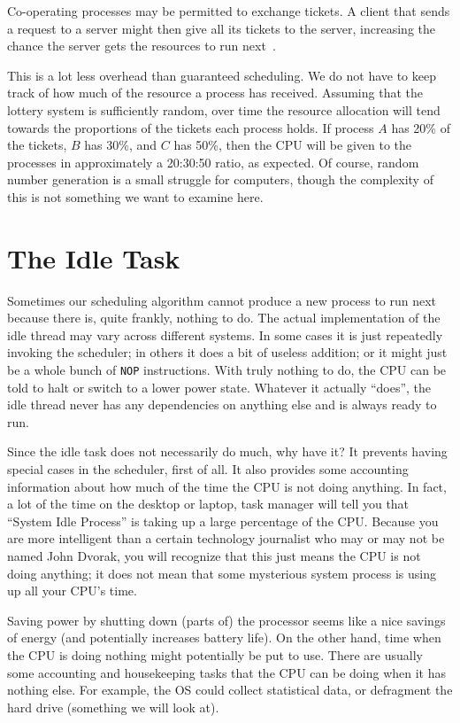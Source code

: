 Co-operating processes may be permitted to exchange tickets. A client that sends a request to a server might then give all its tickets to the server, increasing the chance the server gets the resources to run next~\cite{mos}.

This is a lot less overhead than guaranteed scheduling. We do not have to keep track of how much of the resource a process has received. Assuming that the lottery system is sufficiently random, over time the resource allocation will tend towards the proportions of the tickets each process holds. If process $A$ has 20\% of the tickets, $B$ has 30\%, and $C$ has 50\%, then the CPU will be given to the processes in approximately a 20:30:50 ratio, as expected. Of course, random number generation is a small struggle for computers, though the complexity of this is not something we want to examine here.


\section*{The Idle Task}

Sometimes our scheduling algorithm cannot produce a new process to run next because there is, quite frankly, nothing to do. The actual implementation of the idle thread may vary across different systems. In some cases it is just repeatedly invoking the scheduler; in others it does a bit of useless addition; or it might just be a whole bunch of \texttt{NOP} instructions. With truly nothing to do, the CPU can be told to halt or switch to a lower power state. Whatever it actually ``does'', the idle thread never has any dependencies on anything else and is always ready to run.

Since the idle task does not necessarily do much, why have it? It prevents having special cases in the scheduler, first of all. It also provides some accounting information about how much of the time the CPU is not doing anything. In fact, a lot of the time on the desktop or laptop, task manager will tell you that ``System Idle Process'' is taking up a large percentage of the CPU. Because you are more intelligent than a certain technology journalist who may or may not be named John Dvorak, you will recognize that this just means the CPU is not doing anything; it does not mean that some mysterious system process is using up all your CPU's time.

Saving power by shutting down (parts of) the processor seems like a nice savings of energy (and potentially increases battery life). On the other hand, time when the CPU is doing nothing might potentially be put to use. There are usually some accounting and housekeeping tasks that the CPU can be doing when it has nothing else. For example, the OS could collect statistical data, or defragment the hard drive (something we will look at).

